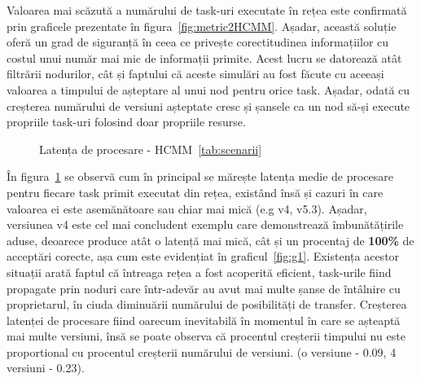\documentclass[12pt,a4paper]{report}
\begin{document}
Valoarea mai scăzută a numărului de task-uri executate în rețea este confirmată prin graficele prezentate în figura~\ref{fig:metric2HCMM}. Așadar, această soluție oferă un grad de siguranță în ceea ce privește corectitudinea informațiilor cu costul unui număr mai mic de informații primite. Acest lucru se datorează atât filtrării nodurilor, cât și faptului că aceste simulări au fost făcute cu aceeași valoarea a timpului de așteptare al unui nod pentru orice task. Așadar, odată cu creșterea numărului de versiuni așteptate cresc și șansele ca un nod să-și execute propriile task-uri folosind doar propriile resurse.

\begin{figure}%
    \centering
    \qquad
    \caption{Latența de procesare - HCMM~\ref{tab:scenarii}}%
    \label{fig:metric3HCMM}%
\end{figure}
 
În figura~\ref{fig:metric3HCMM} se observă cum în principal se mărește latența medie de procesare pentru fiecare task primit executat din rețea, existând însă și cazuri în care valoarea ei este asemănătoare sau chiar mai mică (e.g v4, v5.3). Așadar, versiunea v4 este cel mai concludent exemplu care demonstrează îmbunătățirile aduse, deoarece produce atât o latență mai mică, cât și un procentaj de \textbf{100\%} de acceptări corecte, așa cum este evidențiat în graficul~\ref{fig:g1}. Existența acestor situații arată faptul că întreaga rețea a fost acoperită eficient, task-urile fiind propagate prin noduri care într-adevăr au avut mai multe șanse de întâlnire cu proprietarul, în ciuda diminuării numărului de posibilități de transfer. Creșterea latenței de procesare fiind oarecum inevitabilă în momentul în care se așteaptă mai multe versiuni, însă se poate observa că procentul creșterii timpului nu este proportional cu procentul creșterii numărului de versiuni. (o versiune - 0.09, 4 versiuni - 0.23).
\end{document}
